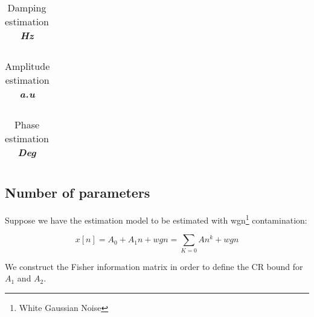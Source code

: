  \begin{table}[!htbp]
\centering
\caption{Damping estimation \textbf{\textit{Hz}}}

\begin{tabular}{c c c c c c c c c c c c c c c c c c c c c c c c c c c c c c c } 
\hline 
 



\hline 
\end{tabular}
\end{table}





 \begin{table}[!htbp]
\centering
\caption{Amplitude estimation \textbf{\textit{a.u}}}

\begin{tabular}{c c c c c c c c c c c c c c c c c c c c c c c c c c c c c c c } 
\hline 

 

\hline 
\end{tabular}
\end{table}



 \begin{table}[!htbp]
\centering
\caption{Phase estimation \textbf{\textit{Deg}}}

\begin{tabular}{c c c c c c c c c c c c c c c c c c c c c c c c c c c c c c c } 
\hline 
   


\hline 
\end{tabular}
\end{table}  
    
    



\newpage

\subsection{Number of parameters}\label{A2}

Suppose we have the estimation model to be estimated with wgn\footnote{White Gaussian Noise} contamination:

\begin{equation}
x[n]=A_{0}+A_{1}n+wgn=\sum_{K=0}An^{k}+wgn
\end{equation}

We construct the Fisher information matrix in order to define the CR bound for $A_{1}$ and $A_{2}$.

